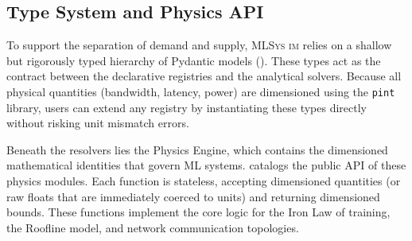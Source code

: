 \documentclass[10pt,twocolumn]{article}
\newcommand{\mlsysim}{\mbox{\textsc{MLSys}\,\textperiodcentered\,\textsc{im}}\xspace}
\begin{document}
\subsection{Type System and Physics API}

To support the separation of demand and supply, \mlsysim relies on a shallow but rigorously typed hierarchy of Pydantic models (). These types act as the contract between the declarative registries and the analytical solvers. Because all physical quantities (bandwidth, latency, power) are dimensioned using the \texttt{pint} library, users can extend any registry by instantiating these types directly without risking unit mismatch errors.

Beneath the resolvers lies the Physics Engine, which contains the dimensioned mathematical identities that govern ML systems.  catalogs the public API of these physics modules. Each function is stateless, accepting dimensioned quantities (or raw floats that are immediately coerced to units) and returning dimensioned bounds. These functions implement the core logic for the Iron Law of training, the Roofline model, and network communication topologies.
\end{document}
